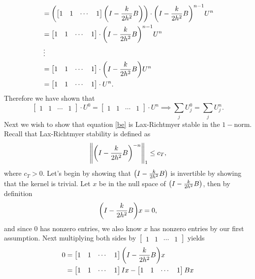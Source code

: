 \documentclass[12pt]{report}
\begin{document}
\begin{solution}
\begin{align*}
      &= {\left(\begin{bmatrix} 1 & 1 & \cdots & 1 \end{bmatrix} {\left(I - \frac{k}{2h^2}B\right)}\right)}\cdot {\left(I - \frac{k}{2h^2}B\right)}^{n-1}U^n\\
      &= \begin{bmatrix} 1 & 1 & \cdots & 1 \end{bmatrix} \cdot {\left(I - \frac{k}{2h^2}B\right)}^{n-1}U^n\\
      &\vdots\\
      &= \begin{bmatrix} 1 & 1 & \cdots & 1 \end{bmatrix} \cdot {\left(I - \frac{k}{2h^2}B\right)}U^n\\
      &= \begin{bmatrix} 1 & 1 & \cdots & 1 \end{bmatrix} \cdot U^n.
    \end{align*}
    Therefore we have shown that
    \[ 
      \begin{bmatrix} 1 & 1 & \cdots & 1 \end{bmatrix} \cdot U^0 = \begin{bmatrix} 1 & 1 & \cdots & 1 \end{bmatrix} \cdot U^n \implies \sum_j U_j^0 = \sum_j U_j^n.
    \]
    Next we wish to show that equation \ref{be} is Lax-Richtmyer stable in the $1-$norm. Recall that Lax-Richtmyer stability is defined as
    \[ 
      \left\| {\left(I - \frac{k}{2h^2}B\right)}^{-n} \right\|_1 \leq c_T,
    \]
    where $c_T > 0$. Let's begin by showing that ${\left(I - \frac{k}{2h^2}B\right)}$ is invertible by showing that the kernel is trivial. Let $x$ be in the null space of ${\left(I - \frac{k}{2h^2}B\right)}$, then by definition
    \[ 
      {\left(I - \frac{k}{2h^2}B\right)} x = 0,
    \]
    and since $0$ has nonzero entries, we also know $x$ has nonzero entries by our first assumption. Next multiplying both sides by $\begin{bmatrix} 1 & 1 & \cdots & 1 \end{bmatrix}$ yields 
    \begin{align*}
      0 &= \begin{bmatrix} 1 & 1 & \cdots & 1 \end{bmatrix} \paren{I - \frac{k}{2h^2}B} x\\ 
      &= \begin{bmatrix} 1 & 1 & \cdots & 1 \end{bmatrix} I x - \begin{bmatrix} 1 & 1 & \cdots & 1 \end{bmatrix} Bx \\

\end{align*}
\end{solution}
\end{document}
